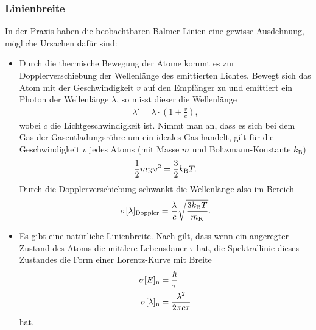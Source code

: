 \subsubsection{Linienbreite}
In der Praxis haben die beobachtbaren Balmer-Linien eine gewisse Ausdehnung, mögliche Ursachen dafür sind:
\begin{itemize}
\item    
Durch die thermische Bewegung der Atome kommt es zur Dopplerverschiebung der Wellenlänge des emittierten Lichtes. Bewegt sich das Atom mit der Geschwindigkeit $v$ auf den Empfänger zu und emittiert ein Photon der Wellenlänge $\lambda$, so misst dieser die Wellenlänge 
\begin{align*}
  \lambda'=\lambda \cdot \left(  1+ \frac{v}{c} \right),
\end{align*} 
wobei $c$ die Lichtgeschwindigkeit ist. Nimmt man an, dass es sich bei dem Gas der Gasentladungsröhre um ein ideales Gas handelt, gilt für die Geschwindigkeit $v$ jedes Atoms (mit Masse $m$ und Boltzmann-Konstante $k_\mathrm{B}$)
\begin{align*}
  \frac{1}{2} m_\mathrm{K} v^2=\frac{3}{2} k_\mathrm{B} T.
\end{align*}
Durch die Dopplerverschiebung schwankt die Wellenlänge also im Bereich
\begin{align}
  \sigma[\lambda]_\mathrm{Doppler}=\frac{\lambda}{c}\sqrt{\frac{3k_\mathrm{B}T}{m_\mathrm{K}}}.
  \label{equ:doppler}
\end{align}
\item Es gibt eine natürliche Linienbreite. Nach \cite{unschaerfe} gilt, dass wenn ein angeregter Zustand des Atoms die mittlere Lebensdauer $\tau$ hat, die Spektrallinie dieses Zustandes die Form einer Lorentz-Kurve mit Breite 
\begin{align}
  \sigma[E]_\mathrm{n}&=\frac{\hbar}{\tau}\nonumber\\
  \sigma[\lambda]_\mathrm{n} &= \frac{\lambda^2}{2\pi c \tau}
  \label{equ:natbreite}
\end{align}
hat.
\end{itemize}